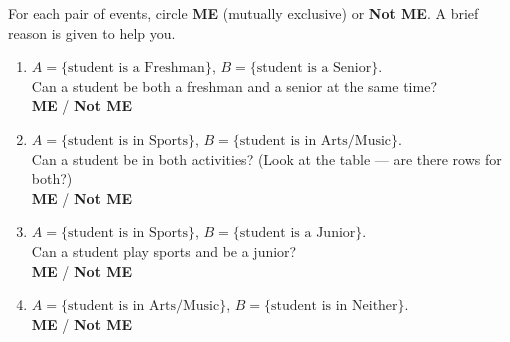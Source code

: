 \documentclass[10pt]{article}
\begin{document}
\begin{tcolorbox}[colback=greenbg, colframe=greenacc, boxrule=0.9pt, arc=2mm,
    left=3mm, right=3mm, top=2mm, bottom=2mm,
    title={\bfseries\small Tier R --- Remediate: Identifying Mutually Exclusive Events},
    fonttitle=\small]
\small
For each pair of events, circle \textbf{ME} (mutually exclusive) or \textbf{Not ME}.
A brief reason is given to help you.

\vspace{6pt}
\begin{enumerate}[leftmargin=1.5em, itemsep=8pt]
  \item $A = \{\text{student is a Freshman}\}$, $B = \{\text{student is a Senior}\}$.\\
        Can a student be both a freshman and a senior at the same time?
        \blank{3cm}\\
        \textbf{ME} \quad / \quad \textbf{Not ME}

  \item $A = \{\text{student is in Sports}\}$, $B = \{\text{student is in Arts/Music}\}$.\\
        Can a student be in both activities? (Look at the table --- are there rows for both?)
        \blank{3cm}\\
        \textbf{ME} \quad / \quad \textbf{Not ME}

  \item $A = \{\text{student is in Sports}\}$, $B = \{\text{student is a Junior}\}$.\\
        Can a student play sports and be a junior? \blank{3cm}\\
        \textbf{ME} \quad / \quad \textbf{Not ME}

  \item $A = \{\text{student is in Arts/Music}\}$, $B = \{\text{student is in Neither}\}$.\\
        \textbf{ME} \quad / \quad \textbf{Not ME}
\end{enumerate}
\end{tcolorbox}

\vspace{0.1in}
\end{document}
